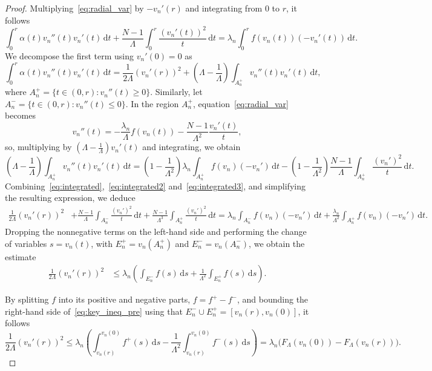 \documentclass[10pt,twoside,english,reqno,a4paper]{amsart}
\theoremstyle{plain}
\theoremstyle{plain}
\theoremstyle{definition}
\theoremstyle{remark}
\numberwithin{equation}{section}
\begin{document}
\begin{proof}
Multiplying~\eqref{eq:radial_var} by $-v_n'(r)$ and integrating from $0$ to $r$, it follows
\begin{equation}\label{eq:integrated}
\int_0^r \alpha(t) v_n''(t) v_n'(t) \, \mathrm{d}t + \frac{N-1}{\Lambda}\int_0^r \frac{(v_n'(t))^2}{t} \, \mathrm{d}t = \lambda_n \int_0^r f(v_n(t))(-v_n'(t)) \, \mathrm{d}t.
\end{equation}
We decompose the first term using $v_n'(0) = 0$ as
\begin{equation}
\label{eq:integrated2}
\int_0^r \alpha(t) v_n''(t) v_n'(t) \, \mathrm{d}t = \frac{1}{2\Lambda}(v_n'(r))^2 + \left(\Lambda - \frac{1}{\Lambda}\right) \int_{A_n^+} v_n''(t) v_n'(t) \, \mathrm{d}t,
\end{equation}
where $A_n^+ = \{t \in (0,r) : v_n''(t) \geq 0\}$. Similarly, let $A_n^- = \{t \in (0,r) : v_n''(t) \leq 0\}$. In the region $A_n^+$, equation~\eqref{eq:radial_var} becomes
\[
v_n''(t) = -\frac{\lambda_n}{\Lambda} f(v_n(t)) - \frac{N-1}{\Lambda^2}\frac{v_n'(t)}{t},
\]
so, multiplying by $\left(\Lambda - \frac{1}{\Lambda}\right) v_n'(t)$ and integrating, we obtain
\begin{equation}
\label{eq:integrated3}
\left(\Lambda - \frac{1}{\Lambda}\right)\int_{A_n^+} v_n''(t) v_n'(t) \, \mathrm{d}t = \left(1- \frac{1}{\Lambda^2}\right) \lambda_n \int_{A_n^+} f(v_n)(-v_n') \, \mathrm{d}t - \left(1- \frac{1}{\Lambda^2}\right) \frac{N-1}{\Lambda}\int_{A_n^+} \frac{(v_n')^2}{t} \, \mathrm{d}t.
\end{equation}
Combining~\eqref{eq:integrated},~\eqref{eq:integrated2} and~\eqref{eq:integrated3}, and simplifying the resulting expression, we deduce
\begin{align*}
\frac{1}{2\Lambda}(v_n'(r))^2 &+ \frac{N-1}{\Lambda}\int_{A_n^-}\frac{(v_n')^2}{t}\,\mathrm{d}t + \frac{N-1}{\Lambda^3}\int_{A_n^+}\frac{(v_n')^2}{t}\,\mathrm{d}t = \lambda_n\int_{A_n^-} f(v_n)(-v_n')\,\mathrm{d}t + \frac{\lambda_n}{\Lambda^2}\int_{A_n^+} f(v_n)(-v_n')\,\mathrm{d}t.
\end{align*}
Dropping the nonnegative terms on the left-hand side and performing the change of variables $s = v_n(t)$, with $E_n^+ = v_n(A_n^+)$ and $E_n^- = v_n(A_n^-)$, we obtain the estimate
\begin{align}
\frac{1}{2\Lambda}(v_n'(r))^2 &\leq \lambda_n\left(\int_{E_n^-} f(s) \, \mathrm{d}s + \frac{1}{\Lambda^2}\int_{E_n^+} f(s) \, \mathrm{d}s\right). \label{eq:key_ineq_pre}
\end{align}

By splitting $f$ into its positive and negative parts, $f=f^+-f^-$, and bounding the right-hand side of~\eqref{eq:key_ineq_pre} using that $E_n^- \cup E_n^+ = [v_n(r), v_n(0)]$, it follows
\begin{equation}\label{eq:key_ineq_3}
\frac{1}{2\Lambda}(v_n'(r))^2 \leq \lambda_n \left( \int_{v_n(r)}^{v_n(0)} f^+(s) \, \mathrm{d}s - \frac{1}{\Lambda^2} \int_{v_n(r)}^{v_n(0)} f^-(s) \, \mathrm{d}s \right) = \lambda_n \big( F_\Lambda(v_n(0))-F_\Lambda(v_n(r)) \big).
\end{equation}


\end{proof}
\end{document}
